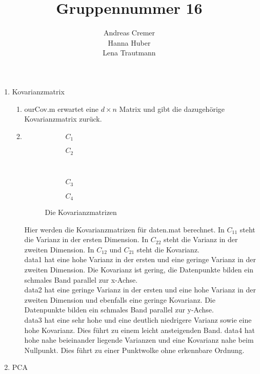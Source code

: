 \documentclass[]{report}
\title{Gruppennummer 16}
\author{Andreas Cremer\\Hanna Huber\\Lena Trautmann}
\newlength\figureheight
\newlength\figurewidth
\begin{document}
\maketitle


\begin{enumerate}
	\item Kovarianzmatrix
	\begin{enumerate}
		\item
		ourCov.m erwartet eine $d \times n$ Matrix und gibt die dazugehörige Kovarianzmatrix zurück.
		\item
		\setlength\figureheight{5cm}
		\setlength{}
		\begin{figure}[tbp!]
			\begin{subfigure}{0.45\textwidth}
				\centering
				
				\caption{$C_{1}$}
				\label{fig:cov1}
			\end{subfigure}
			\qquad
			\begin{subfigure}{0.45\textwidth}
				\centering
				
				\caption{$C_{2}$}
				\label{fig:cov2}
			\end{subfigure}	
			\\
			\begin{subfigure}{0.45\textwidth}
				\centering
				
				\caption{$C_{3}$}
				\label{fig:cov3}
			\end{subfigure}
			\qquad
			\begin{subfigure}{0.45\textwidth}
				\centering
				
				\caption{$C_{4}$}
				\label{fig:cov4}
			\end{subfigure}	
			\caption{Die Kovarianzmatrizen}
			\label{fig:cov}
		\end{figure}
		
		Hier werden die Kovarianzmatrizen für daten.mat berechnet. In $C_{11}$ steht die Varianz in der ersten Dimension. In $C_{22}$ steht die Varianz in der zweiten Dimension. In $C_{12}$ und $C_{21}$ steht die Kovarianz.\\
		data1 hat eine hohe Varianz in der ersten und eine geringe Varianz in der zweiten Dimension. Die Kovarianz ist gering, die Datenpunkte bilden ein schmales Band parallel zur x-Achse.\\
		data2 hat eine geringe Varianz in der ersten und eine hohe Varianz in der zweiten Dimension und ebenfalls eine geringe Kovarianz. Die Datenpunkte bilden ein schmales Band parallel zur y-Achse.\\
		data3 hat eine sehr hohe und eine deutlich niedrigere Varianz sowie eine hohe Kovarianz. Dies führt zu einem leicht ansteigenden Band.
		data4 hat hohe nahe beieinander liegende Varianzen und eine Kovarianz nahe beim Nullpunkt. Dies führt zu einer Punktwolke ohne erkennbare Ordnung.
	\end{enumerate}
	\item PCA\\
	

\end{enumerate}
\end{document}

